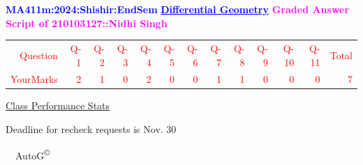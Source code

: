 \documentclass{article}                              %
\begin{document}
%
\vspace*{1in}

\begin{center}
	\textbf{\textcolor{blue}{\LARGE MA411m:2024:Shishir:EndSem}}
	\vskip 1cm
	\textbf{\textcolor{blue}{\underline{\Large Differential Geometry}}}
	\vskip 1cm
	\textbf{\textcolor{magenta}{\LARGE Graded Answer Script of 210103127::Nidhi Singh}}
\end{center}


\begin{center}
	\Huge 
	\textcolor{red}{
	\begin{tabular}{*{13}{r}}
		Question&Q-1& Q-2& Q-3& Q-4& Q-5& Q-6& Q-7& Q-8& Q-9& Q-10& Q-11&Total  \\
        	YourMarks&2&1&0&2&0&0&1&1&0&0&0&7
	\end{tabular}
	}
        \vskip 2cm
	\large
	\underline{Class Performance Stats}
	\DTLsetseparator{;}
	\begin{table}[htbp]
		\centering
	\end{table}
	\vskip 1cm
	Deadline for recheck requests is Nov. 30
\end{center}
\ \vfill \ \hfill \small AutoG\textsuperscript{\copyright}
\newpage
%
\end{document}

